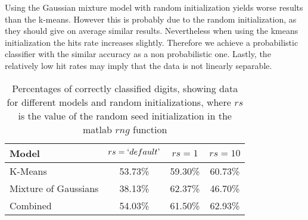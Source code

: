 \documentclass[12pt]{article}
\begin{document}
Using the Gaussian mixture model with random initialization yields worse results than the k-means.
However this is probably due to the random initialization, as they should give on average similar results.
Nevertheless when using the kmeans initialization the hits rate increases slightly.
Therefore we achieve a probabilistic classifier with the similar accuracy as a non probabilistic one.
Lastly, the relatively low hit rates may imply that the data is not linearly separable.

\begin{table}[h]
\caption[Table caption text]{Percentages of correctly classified digits, showing data for different models and random initializations, where $rs$ is the value of the random seed initialization in the matlab $rng$ function }
\label{tab:results}
\begin{tabular}{|l|c|c|c|}
\hline
Model                 & $rs = ` default \textrm'$ & $rs = 1$ & $rs = 10$ \\ \hline
K-Means               & 53.73\%             &   	59.30\%    &    60.73\%     \\ \hline
Mixture of  Gaussians & 38.13\%             &   	62.37\%    &    46.70\%     \\ \hline
Combined              & 54.03\%             &    61.50\%    &    62.93\%     \\ \hline
\end{tabular}
\end{table}
 
\end{document}
